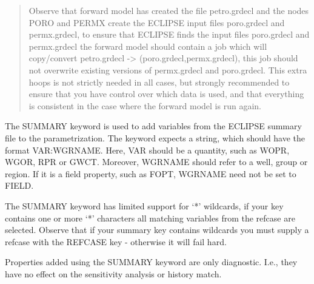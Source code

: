 \documentclass[letterpaper,10pt,english]{sphinxmanual}
\begin{document}
\begin{sphinxShadowBox}
\begin{quote}
Observe that forward model has created the file petro.grdecl and the nodes
PORO and PERMX create the ECLIPSE input files poro.grdecl and permx.grdecl, to
ensure that ECLIPSE finds the input files poro.grdecl and permx.grdecl the
forward model should contain a job which will copy/convert petro.grdecl -\textgreater{}
(poro.grdecl,permx.grdecl), this job should not overwrite existing versions of
permx.grdecl and poro.grdecl. This extra hoops is not strictly needed in all
cases, but strongly recommended to ensure that you have control over which
data is used, and that everything is consistent in the case where the forward
model is run again.
\end{quote}
\end{sphinxShadowBox}
\label{\detokenize{keywords/index:summary}}
\begin{sphinxShadowBox}

The SUMMARY keyword is used to add variables from the ECLIPSE summary file to
the parametrization. The keyword expects a string, which should have the
format VAR:WGRNAME. Here, VAR should be a quantity, such as WOPR, WGOR, RPR or
GWCT. Moreover, WGRNAME should refer to a well, group or region. If it is a
field property, such as FOPT, WGRNAME need not be set to FIELD.


%
\begin{sphinxVerbatim}[commandchars=\\\{\}]
        
 
 
                     
\end{sphinxVerbatim}

The SUMMARY keyword has limited support for ‘*’ wildcards, if your key
contains one or more ‘*’ characters all matching variables from the refcase
are selected. Observe that if your summary key contains wildcards you must
supply a refcase with the REFCASE key - otherwise it will fail hard.

 Properties added using the SUMMARY keyword are only diagnostic. I.e., they have no effect on the sensitivity analysis or history match.
\end{sphinxShadowBox}
\end{document}
